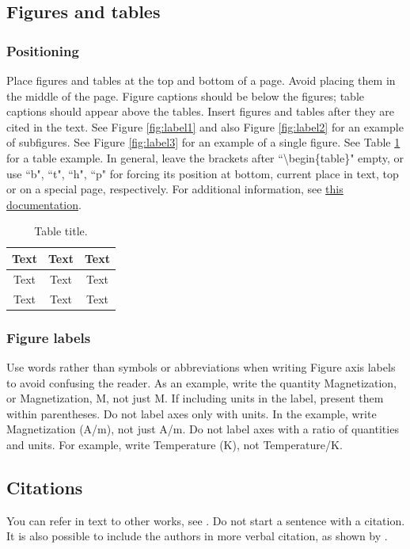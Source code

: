 \documentclass[11pt]{report}
\numberwithin{equation}{chapter}		%
\numberwithin{figure}{chapter}			%
\numberwithin{table}{chapter}			%
\begin{document}
\subsection{Figures and tables}
\subsubsection{Positioning} Place figures and tables at the top and bottom of a page. Avoid placing them in the middle of the page. Figure captions should be below the figures; table captions should appear above the tables. Insert figures and tables after they are cited in the text. See Figure \ref{fig:label1} and also Figure \ref{fig:label2} for an example of subfigures. See Figure \ref{fig:label3} for an example of a single figure. See Table \ref{tab:tab_example} for a table example. In general, leave the brackets after ``\textbackslash{}begin\{table\}" empty, or use ``b", ``t", ``h", ``p" for forcing its position at bottom, current place in text, top or on a special page, respectively. For additional information, see \href{https://www.overleaf.com/learn/latex/Positioning_of_Figures}{this documentation}.
\begin{table}[h]
	\centering
	\caption{Table title.}
	\label{tab:tab_example}
	\begin{tabular}{c|c|c}
		\toprule
		Text & Text & Text  \\ \midrule
    	Text & Text & Text  \\
		Text & Text & Text  \\ \bottomrule
	\end{tabular}
\end{table}

\subsubsection{Figure labels} Use words rather than symbols or abbreviations when writing Figure axis labels to avoid confusing the reader. As an example, write the quantity Magnetization, or Magnetization, M, not just M. If including units in the label, present them within parentheses. Do not label axes only with units. In the example, write Magnetization (A/m), not just A/m. Do not label axes with a ratio of quantities and units. For example, write Temperature (K), not Temperature/K.

\subsection{Citations}
You can refer in text to other works, see \cite{StabilityAndConvergence}. Do not start a sentence with a citation. It is also possible to include the authors in more verbal citation, as shown by \textcite{StabilityAndConvergence}. 
\end{document}
